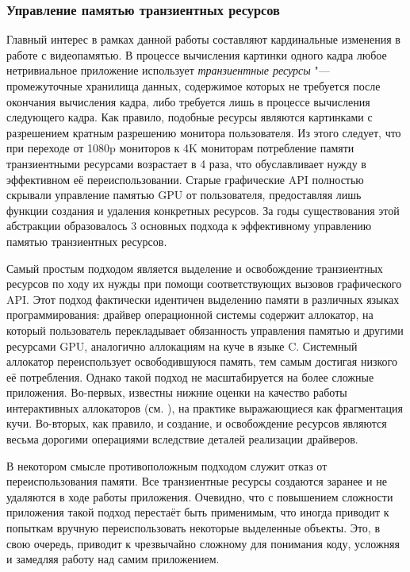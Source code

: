 \subsubsection{Управление памятью транзиентных ресурсов}
Главный интерес в рамках данной работы составляют кардинальные изменения в работе с видеопамятью.
В процессе вычисления картинки одного кадра любое нетривиальное приложение использует \textit{транзиентные ресурсы} "--- промежуточные хранилища данных, содержимое которых не требуется после окончания вычисления кадра, либо требуется лишь в процессе вычисления следующего кадра.
Как правило, подобные ресурсы являются картинками с разрешением кратным разрешению монитора пользователя.
Из этого следует, что при переходе от 1080p мониторов к 4K мониторам потребление памяти транзиентными ресурсами возрастает в 4 раза, что обуславливает нужду в эффективном её переиспользовании.
Старые графические API полностью скрывали управление памятью GPU от пользователя, предоставляя лишь функции создания и удаления конкретных ресурсов.
За годы существования этой абстракции образовалось 3 основных подхода к эффективному управлению памятью транзиентных ресурсов.

Самый простым подходом является выделение и освобождение транзиентных ресурсов по ходу их нужды при помощи соответствующих вызовов графического API.
Этот подход фактически идентичен выделению памяти в различных языках программирования: драйвер операционной системы содержит аллокатор, на который пользователь перекладывает обязанность управления памятью и другими ресурсами GPU, аналогично аллокациям на куче в языке C.
Системный аллокатор переиспользует освободившуюся память, тем самым достигая низкого её потребления.
Однако такой подход не масштабируется на более сложные приложения.
Во-первых, известны нижние оценки на качество работы интерактивных аллокаторов (см. \cite{robson1971estimate}), на практике выражающиеся как фрагментация кучи.
Во-вторых, как правило, и создание, и освобождение ресурсов являются весьма дорогими операциями вследствие деталей реализации драйверов.

В некотором смысле противоположным подходом служит отказ от переиспользования памяти.
Все транзиентные ресурсы создаются заранее и не удаляются в ходе работы приложения.
Очевидно, что с повышением сложности приложения такой подход перестаёт быть применимым, что иногда приводит к попыткам вручную переиспользовать некоторые выделенные объекты.
Это, в свою очередь, приводит к чрезвычайно сложному для понимания коду, усложняя и замедляя работу над самим приложением.

